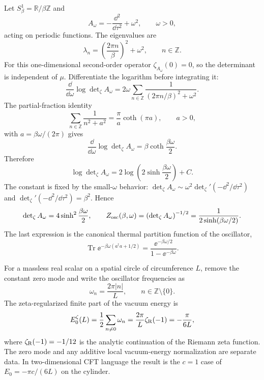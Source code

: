 \begin{example}
\label{ex:zeta-thermal-harmonic-oscillator}
Let \(S^1_\beta=\mathbb R/\beta\mathbb Z\) and
\[
  A_\omega=-\frac{\dd^2}{\dd\tau^2}+\omega^2,
  \qquad
  \omega>0,
\]
acting on periodic functions.  The eigenvalues are
\[
  \lambda_n=\left(\frac{2\pi n}{\beta}\right)^2+\omega^2,
  \qquad n\in\mathbb Z.
\]
For this one-dimensional second-order operator \(\zeta_{A_\omega}(0)=0\), so
the determinant is independent of \(\mu\).  Differentiate the logarithm before
integrating it:
\[
  \frac{\dd}{\dd\omega}
  \log\det\nolimits_{\zeta}A_\omega
  =
  2\omega
  \sum_{n\in\mathbb Z}
  \frac{1}{(2\pi n/\beta)^2+\omega^2}.
\]
The partial-fraction identity
\[
  \sum_{n\in\mathbb Z}\frac{1}{n^2+a^2}
  =
  \frac{\pi}{a}\coth(\pi a),
  \qquad a>0,
\]
with \(a=\beta\omega/(2\pi)\) gives
\[
  \frac{\dd}{\dd\omega}
  \log\det\nolimits_{\zeta}A_\omega
  =
  \beta\coth\frac{\beta\omega}{2}.
\]
Therefore
\[
  \log\det\nolimits_{\zeta}A_\omega
  =
  2\log\left(2\sinh\frac{\beta\omega}{2}\right)+C .
\]
The constant is fixed by the small-\(\omega\) behavior:
\(\det_\zeta A_\omega\sim \omega^2\det_\zeta'(-\dd^2/\dd\tau^2)\) and
\(\det_\zeta'(-\dd^2/\dd\tau^2)=\beta^2\).  Hence
\begin{equation}
  \det\nolimits_{\zeta}A_\omega
  =
  4\sinh^2\frac{\beta\omega}{2},
  \qquad
  Z_{\rm osc}(\beta,\omega)
  =
  \left(\det\nolimits_{\zeta}A_\omega\right)^{-1/2}
  =
  \frac{1}{2\sinh(\beta\omega/2)} .
  \label{eq:zeta-oscillator-determinant}
\end{equation}
The last expression is the canonical thermal partition function of the
oscillator,
\[
  \operatorname{Tr}\ee^{-\beta\omega(a^\dagger a+1/2)}
  =
  \frac{\ee^{-\beta\omega/2}}{1-\ee^{-\beta\omega}}.
\]
\end{example}

\begin{example}
\label{ex:zeta-circle-casimir-energy}
For a massless real scalar on a spatial circle of circumference \(L\), remove
the constant zero mode and write the oscillator frequencies as
\[
  \omega_n=\frac{2\pi |n|}{L},\qquad n\in\mathbb Z\setminus\{0\}.
\]
The zeta-regularized finite part of the vacuum energy is
\begin{equation}
  E_0^{\zeta}(L)
  =
  \frac12\sum_{n\ne0}\omega_n
  =
  \frac{2\pi}{L}\zeta_{\rm R}(-1)
  =
  -\frac{\pi}{6L},
  \label{eq:zeta-circle-casimir}
\end{equation}
where \(\zeta_{\rm R}(-1)=-1/12\) is the analytic continuation of the Riemann
zeta function.  The zero mode and any additive local vacuum-energy
normalization are separate data.  In two-dimensional CFT language the result
is the \(c=1\) case of \(E_0=-\pi c/(6L)\) on the cylinder.
\end{example}

